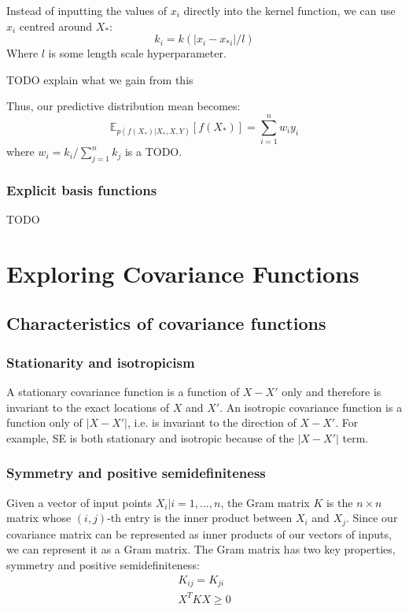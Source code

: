 \documentclass[10pt]{article}
\begin{document}
Instead of inputting the values of $x_i$ directly into the kernel function, we can use $x_i$ centred around $X_*$: 
\begin{equation*}
    k_i = k(|x_i - x_{*i}|/l)
\end{equation*}
Where $l$ is some length scale hyperparameter. 

TODO explain what we gain from this

Thus, our predictive distribution mean becomes:
\begin{equation*}
    \mathbb{E}_{p(f(X_*)|X_*,X,Y)}[f(X_*)] = \sum_{i=1}^n w_i y_i
\end{equation*}
where $w_i = k_i / \sum_{j=1}^n k_j$ is a TODO.


\subsubsection{Explicit basis functions}
TODO

\section{Exploring Covariance Functions \cite{gp-ml}}


\subsection{Characteristics of covariance functions \cite{gp-ml}}

\subsubsection{Stationarity and isotropicism}
A stationary covariance function is a function of $X - X'$ only and therefore is invariant to the exact locations of $X$ and $X'$. An isotropic covariance function is a function only of $|X - X'|$, i.e. is invariant to the direction of $X - X'$. For example, SE \cite{eq:se} is both stationary and isotropic because of the $|X - X'|$ term.

\subsubsection{Symmetry and positive semidefiniteness}
Given a vector of input points ${X_i | i = 1, ..., n}$, the Gram matrix $K$ is the $n \times n$ matrix whose $(i,j)$-th entry is the inner product between $X_i$ and $X_j$. Since our covariance matrix can be represented as inner products of our vectors of inputs, we can represent it as a Gram matrix. The Gram matrix has two key properties, symmetry and positive semidefiniteness:
\begin{equation*}
    \begin{aligned}
        K_{ij} = K_{ji} \\
        X^T K X \geq 0
    \end{aligned}
\end{equation*}
\end{document}
